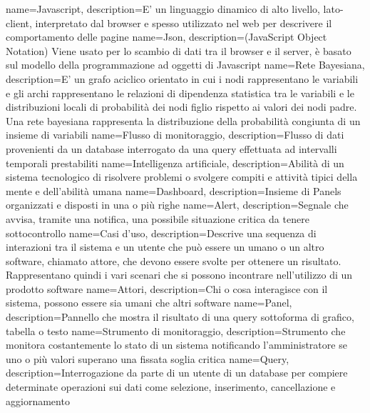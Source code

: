 {
    name=Javascript,
    description={E' un linguaggio dinamico di alto livello, lato-client, interpretato dal browser e spesso utilizzato nel web per descrivere il comportamento delle pagine}
}
{
    name=Json,
    description={(JavaScript Object Notation) Viene usato per lo scambio di dati tra il browser e il server, è basato sul modello della programmazione ad oggetti di Javascript}
}
{
    name=Rete Bayesiana,
    description={E' un grafo aciclico orientato in cui i nodi rappresentano le variabili e gli archi rappresentano le relazioni di dipendenza statistica tra le variabili e le distribuzioni locali di probabilità dei nodi figlio rispetto ai valori dei nodi padre. Una rete bayesiana rappresenta la distribuzione della probabilità congiunta di un insieme di variabili
}
}
{
    name=Flusso di monitoraggio,
    description={Flusso di dati provenienti da un database interrogato da una query effettuata ad intervalli temporali prestabiliti}
}
{
    name=Intelligenza artificiale,
    description={Abilità di un sistema tecnologico di risolvere problemi o svolgere compiti e attività tipici della mente e dell’abilità umana}
}
{
    name=Dashboard,
    description={Insieme di Panels organizzati e disposti in una o più righe}
}
{
    name=Alert,
    description={Segnale che avvisa, tramite una notifica, una possibile situazione critica da tenere sottocontrollo}
}
{
    name=Casi d'uso,
    description={Descrive una sequenza di interazioni tra il sistema e un utente che può essere un umano o un altro software, chiamato attore, che devono essere svolte per ottenere un risultato. Rappresentano quindi i vari scenari che si possono incontrare nell’utilizzo di un prodotto software}
}
{
    name=Attori,
    description={Chi o cosa interagisce con il sistema, possono essere sia umani che altri software}
}
{
    name=Panel,
    description={Pannello che mostra il risultato di una query sottoforma di grafico, tabella o testo}
}
{
    name=Strumento di monitoraggio,
    description={Strumento che monitora costantemente lo stato di un sistema notificando l'amministratore se uno o più valori superano una fissata soglia critica}
}
{
    name=Query,
    description={Interrogazione da parte di un utente di un database per compiere determinate operazioni sui dati come selezione, inserimento, cancellazione e aggiornamento}
}
